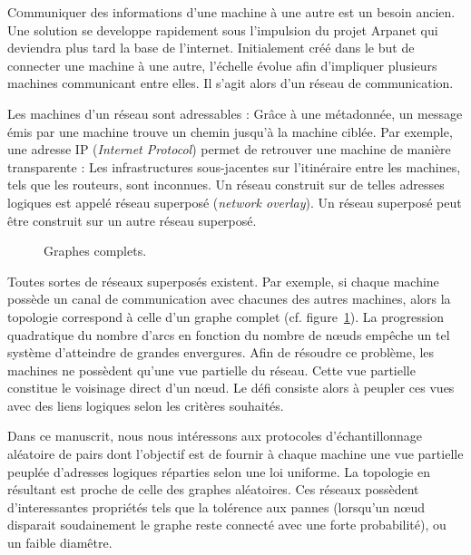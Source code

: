 
\lettrine{C}ommuniquer des informations d'une machine à une autre est un besoin
ancien. Une solution se developpe rapidement sous l'impulsion du projet Arpanet
qui deviendra plus tard la base de l'internet. Initialement créé dans le but de
connecter une machine à une autre, l'échelle évolue afin d'impliquer plusieurs
machines communicant entre elles. Il s'agit alors d'un réseau de communication.

Les machines d'un réseau sont adressables : Grâce à une métadonnée, un message
émis par une machine trouve un chemin jusqu'à la machine ciblée. Par exemple,
une adresse IP (\emph{Internet Protocol}) permet de retrouver une machine de
manière transparente : Les infrastructures sous-jacentes sur l'itinéraire entre
les machines, tels que les routeurs, sont inconnues. Un réseau construit sur de
telles adresses logiques est appelé réseau superposé (\emph{network
  overlay}). Un réseau superposé peut être construit sur un autre réseau
superposé.

\begin{figure}
  \begin{center}
    
    \caption{\label{net:fig:completegraph}Graphes complets.}
  \end{center}
\end{figure}

Toutes sortes de réseaux superposés existent. Par exemple, si chaque machine
possède un canal de communication avec chacunes des autres machines, alors la
topologie correspond à celle d'un graphe complet
(cf. figure~\ref{net:fig:completegraph}). La progression quadratique du nombre
d'arcs en fonction du nombre de nœuds empêche un tel système d'atteindre de
grandes envergures. Afin de résoudre ce problème, les machines ne possèdent
qu'une vue partielle du réseau. Cette vue partielle constitue le voisinage
direct d'un nœud. Le défi consiste alors à peupler ces vues avec des liens
logiques selon les critères souhaités.

Dans ce manuscrit, nous nous intéressons aux protocoles d'échantillonnage
aléatoire de pairs dont l'objectif est de fournir à chaque machine une vue
partielle peuplée d'adresses logiques réparties selon une loi uniforme. La
topologie en résultant est proche de celle des graphes aléatoires. Ces réseaux
possèdent d'interessantes propriétés tels que la tolérence aux pannes (lorsqu'un
nœud disparait soudainement le graphe reste connecté avec une forte
probabilité), ou un faible diamêtre.


